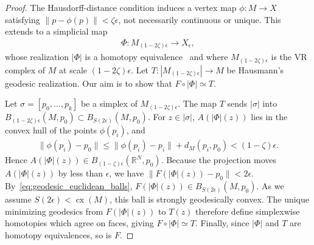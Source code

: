 \documentclass[11pt,reqno]{amsproc}
\numberwithin{equation}{section}
\newcommand{\R}{\mathbb{R}}
\newcommand{\cx}{\operatorname{cx}}
\newcommand{\ball}[3]{B_{#3}(#1, #2)} %
\theoremstyle{definition}
\theoremstyle{plain}
\begin{document}
    \begin{proof}
        The Hausdorff-distance condition induces a vertex map $\phi:M\to X$ satisfying $\|p-\phi(p)\|<\zeta\epsilon$, not necessarily continuous or unique. This extends to a simplicial map
        \begin{align}
            \Phi:M_{(1-2\zeta)\epsilon}\to X_\epsilon,
        \end{align}
        whose realization $|\Phi|$ is a homotopy equivalence~\cite[Theorem~18]{majhi_demystifying_2024}  and where $M_{(1-2\zeta)\epsilon}$ is the VR complex of $M$ at scale $(1-2\zeta)\epsilon$.  Let $T:|M_{(1-2\zeta)\epsilon}|\to M$ be Hausmann's geodesic realization. Our aim is to show that $F\circ |\Phi|\simeq T$.

        Let $\sigma=[p_0,\ldots,p_k]$ be a simplex of $M_{(1-2\zeta)\epsilon}$.  The map $T$ sends $|\sigma|$ into $\ball{M}{p_0}{(1-2\zeta)\epsilon}\subset \ball{M}{p_0}{S(2\epsilon)}$.  For $z\in |\sigma|$, $A(|\Phi|(z))$ lies in the convex hull of the points $\phi(p_i)$, and
        \begin{align}
            \|\phi(p_i)-p_0\|\leq \|\phi(p_i)-p_i\|+d_M(p_i,p_0)<(1-\zeta)\epsilon.
        \end{align}
        Hence $A(|\Phi|(z))\in \ball{\R^N}{p_0}{(1-\zeta)\epsilon}$.  Because the projection moves $A(|\Phi|(z))$ by less than $\epsilon$, we have $\|F(|\Phi|(z))-p_0\|<2\epsilon$.  By~\eqref{eq:geodesic_euclidean_balls}, $F(|\Phi|(z))\in \ball{M}{p_0}{S(2\epsilon)}$.  As we assume $S(2\epsilon)<\cx(M)$, this ball is strongly geodesically convex.  The unique minimizing geodesics from $F(|\Phi|(z))$ to $T(z)$ therefore define simplexwise homotopies which agree on faces, giving $F\circ |\Phi|\simeq T$.  Finally, since $|\Phi|$ and $T$ are homotopy equivalences, so is $F$.
    \end{proof}
\end{document}

